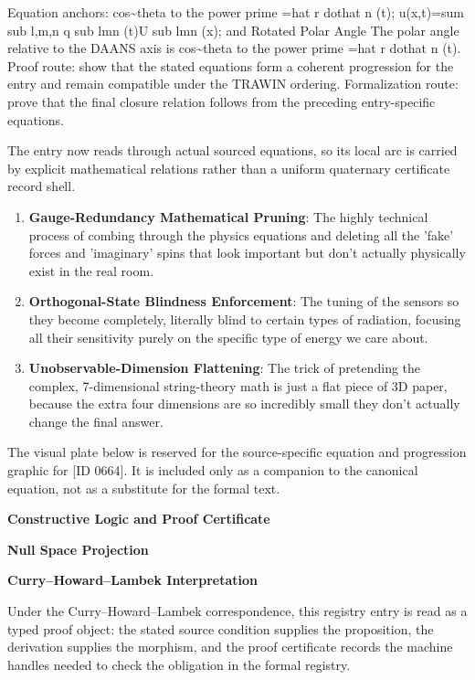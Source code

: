 Equation anchors: cos\textasciitilde{}theta to the power prime =hat r dothat n (t); u(x,t)=sum sub l,m,n q sub lmn (t)U sub lmn (x); and Rotated Polar Angle The polar angle relative to the DAANS axis is cos\textasciitilde{}theta to the power prime =hat r dothat n (t). Proof route: show that the stated equations form a coherent progression for the entry and remain compatible under the TRAWIN ordering. Formalization route: prove that the final closure relation follows from the preceding entry-specific equations.

The entry now reads through actual sourced equations, so its local arc is carried by explicit mathematical relations rather than a uniform quaternary certificate record shell.
\endgroup

\begin{enumerate}[leftmargin=1.6em,itemsep=6pt,topsep=4pt]
\item \textbf{Gauge-Redundancy Mathematical Pruning}: The highly technical process of combing through the physics equations and deleting all the 'fake' forces and 'imaginary' spins that look important but don't actually physically exist in the real room.
\item \textbf{Orthogonal-State Blindness Enforcement}: The tuning of the sensors so they become completely, literally blind to certain types of radiation, focusing all their sensitivity purely on the specific type of energy we care about.
\item \textbf{Unobservable-Dimension Flattening}: The trick of pretending the complex, 7-dimensional string-theory math is just a flat piece of 3D paper, because the extra four dimensions are so incredibly small they don't actually change the final answer.
\end{enumerate}

\begingroup\footnotesize\sloppy
The visual plate below is reserved for the source-specific equation and progression graphic for [ID 0664]. It is included only as a companion to the canonical equation, not as a substitute for the formal text.
\par\endgroup
\ifTZPDarkEdition
{}
\fi

\clearpage
\begingroup\tzpsupportsetup
\noindent\textbf{\fontsize{10.8pt}{12.8pt}\selectfont [ID 0664] Constructive Logic and Proof Certificate}\par
\noindent\textbf{\fontsize{10pt}{12pt}\selectfont Null Space Projection}\par
\vspace{0.45em}
\begingroup
\footnotesize
\setlength{\parskip}{0.22em}
\setlength{\parindent}{0pt}
\noindent\textbf{Curry--Howard--Lambek Interpretation}\par
Under the Curry--Howard--Lambek correspondence, this registry entry is read as a typed proof
object: the stated source condition supplies the proposition, the derivation supplies the
morphism, and the proof certificate records the machine handles needed to check the obligation
in the formal registry.

